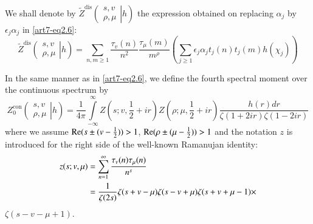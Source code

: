 We shall denote by $\tilde{Z}^{\text{dis}} \left(
\left.
\begin{matrix}
s, v\\
\rho, \mu
\end{matrix}
\right| h
\right) $ the expression obtained on replacing $\alpha_j$ by $\epsilon_j \alpha_j$ in \eqref{art7-eq2.6}:
\begin{equation}
\tilde{Z}^{\text{dis}} \left(
\left.
\begin{matrix}
s, v\\
\rho, \mu
\end{matrix}
\right| h
\right)  = \sum\limits_{n,m \geqslant 1} \frac{\tau_v(n)}{n^2} \frac{\tau_\mu(m)}{m^\rho} \left(\sum\limits_{j \geqslant 1} \epsilon_j \alpha_j t_j (n) t_j (m) h(\chi_j) \right) \label{art7-eq2.7}
\end{equation}

In the same manner as in \eqref{art7-eq2.6}, we define the fourth spectral moment over the continuous spectrum by
\begin{equation}
Z^{\text{con}}_0 
\left(
\left.
\begin{matrix}
s, v\\
\rho, \mu
\end{matrix}
\right| h
\right)  = \frac{1}{4\pi} \int\limits^\infty_{-\infty} Z (s; v,\frac{1}{2} + ir) Z (\rho ; \mu, \frac{1}{2} + ir) \frac{h(r) dr}{\zeta(1+ 2 ir) \zeta (1-2ir)} \label{art7-eq2.8}
\end{equation}
where we assume $\operatorname{Re} (s \pm (v-\frac{1}{2})) >1$, $\operatorname{Re} (\rho \pm (\mu - \frac{1}{2})) >1$ and the notation $z$ is introduced for the right side of the well-known Ramanujan identity:
\begin{align}
z(s; v, \mu) & = \sum\limits^\infty_{n=1} \frac{\tau_v (n) \tau_\mu (n)}{n^s}\label{art7-eq2.9}\\
& = \frac{1}{\zeta(2s)} \zeta(s+v - \mu) \zeta(s-v+\mu) \zeta (s+v+ \mu-1) \times \notag
\end{align}
$\zeta(s-v-\mu+1)$.

